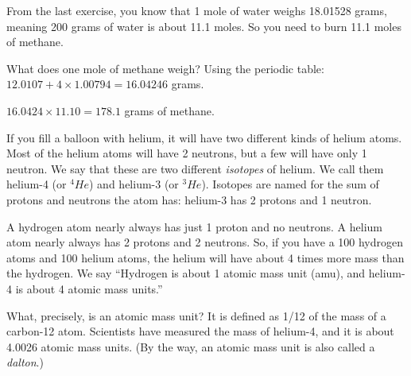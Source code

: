 \begin{Answer}[ref=burning_methane]

From the last exercise, you know that 1 mole of water weighs 18.01528
grams, meaning 200 grams of water is about 11.1 moles. So you need to burn
11.1 moles of methane.

What does one mole of methane weigh? Using the periodic table:
$12.0107 + 4 \times 1.00794 = 16.04246$ grams.

$16.0424 \times 11.10 = 178.1$ grams of methane.

\end{Answer}


If you fill a balloon with helium, it will have two different
kinds of helium atoms. Most of the helium atoms will have 2 neutrons, but a
few will have only 1 neutron. We say that these are two different
\textit{isotopes} of helium. We call them helium-4 (or $^4He$) and
helium-3 (or $^3He$). Isotopes are named for the sum of protons and
neutrons the atom has: helium-3 has 2 protons and 1 neutron.

A hydrogen atom nearly always has just 1 proton and no neutrons. A
helium atom nearly always has 2 protons and 2 neutrons. So, if you
have a 100 hydrogen atoms and 100 helium atoms, the helium will have
about 4 times more mass than the hydrogen. We say ``Hydrogen is about
1 atomic mass unit (amu), and helium-4 is about 4 atomic mass
units.''

What, precisely, is an atomic mass unit? It is defined as 1/12 of
the mass of a carbon-12 atom. Scientists have measured the mass of
helium-4, and it is about 4.0026 atomic mass units. (By the way, an
atomic mass unit is also called a \textit{dalton}.)

\pagebreak


